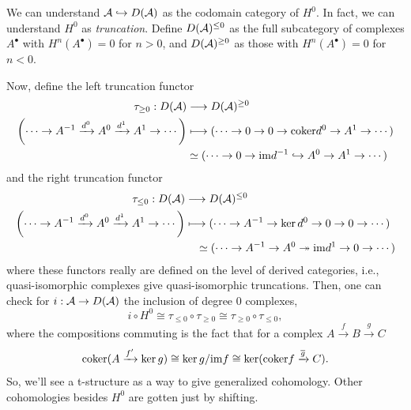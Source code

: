 \documentclass[12pt]{article}
\begin{document}
\begin{rmk}
    We can understand $\mathcal{A} \hookrightarrow D(\mathcal{A})$ as the codomain category of $H^0$. In fact, we can understand $H^0$ as \textit{truncation}. Define $D(\mathcal{A})^{\leq 0}$ as the full subcategory of complexes $A^\bullet$ with $H^n(A^\bullet)=0$ for $n>0$, and $D(\mathcal{A})^{\geq 0}$ as those with $H^n(A^\bullet)=0$ for $n<0$.
    
    Now, define the left truncation functor
    \begin{align*}
        \tau_{\geq 0}: D(\mathcal{A}) & \longrightarrow D(\mathcal{A})^{\geq 0}\\
        \left(\cdots \to A^{-1} \xrightarrow{d^0} A^0 \xrightarrow{d^1} A^{1} \to \cdots\right) & \longmapsto (\cdots \to 0 \to 0\to \mathrm{coker} d^0 \to A^1 \to \cdots)\\
        & \simeq (\cdots \to 0 \to \mathrm{im} d^{-1} \hookrightarrow A^0 \to A^1 \to \cdots) 
    \end{align*}
    and the right truncation functor
    \begin{align*}
        \tau_{\leq 0}: D(\mathcal{A}) &\longrightarrow D(\mathcal{A})^{\leq 0}\\
        \left(\cdots \to A^{-1} \xrightarrow{d^0} A^0 \xrightarrow{d^1} A^{1} \to \cdots\right) &\longmapsto (\cdots \to A^{-1} \to \ker d^0 \to 0 \to 0 \to \cdots)\\
        &\quad \simeq (\cdots \to A^{-1} \to A^0 \twoheadrightarrow \mathrm{im} d^1 \to 0 \to \cdots)
    \end{align*}
    where these functors really are defined on the level of derived categories, i.e., quasi-isomorphic complexes give quasi-isomorphic truncations. Then, one can check for $i: \mathcal{A} \to D(\mathcal{A})$ the inclusion of degree 0 complexes,
    \[i\circ H^0 \cong \tau_{\leq 0} \circ \tau_{\geq 0} \cong \tau_{\geq 0} \circ \tau_{\leq 0},\]
    where the compositions commuting is the fact that for a complex $A\xrightarrow{f} B \xrightarrow{g} C$
    \[\mathrm{coker}(A \xrightarrow{f'} \ker g) \cong \ker g/\mathrm{im} f \cong \ker(\mathrm{coker} f \xrightarrow{\overline{g}} C).\]
    So, we'll see a t-structure as a way to give generalized cohomology. Other cohomologies besides $H^0$ are gotten just by shifting.
\end{rmk}
\end{document}
